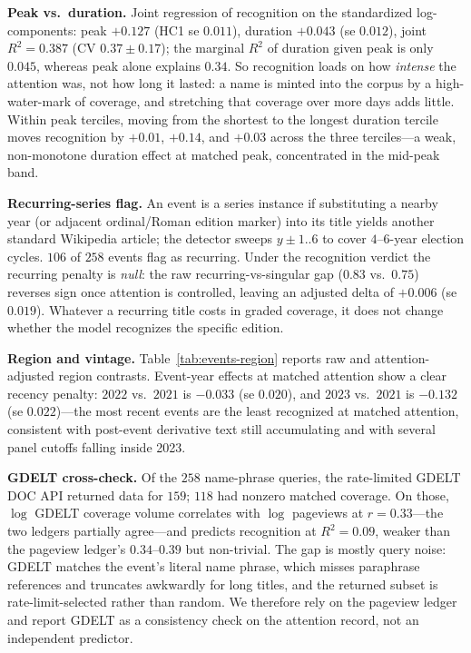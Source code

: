 \textbf{Peak vs.\ duration.} Joint regression of recognition on the standardized log-components: peak $+0.127$ (HC1 se $0.011$), duration $+0.043$ (se $0.012$), joint $R^2 = 0.387$ (CV $0.37 \pm 0.17$); the marginal $R^2$ of duration given peak is only $0.045$, whereas peak alone explains $0.34$. So recognition loads on how \emph{intense} the attention was, not how long it lasted: a name is minted into the corpus by a high-water-mark of coverage, and stretching that coverage over more days adds little. Within peak terciles, moving from the shortest to the longest duration tercile moves recognition by $+0.01$, $+0.14$, and $+0.03$ across the three terciles---a weak, non-monotone duration effect at matched peak, concentrated in the mid-peak band.

\textbf{Recurring-series flag.} An event is a series instance if substituting a nearby year (or adjacent ordinal/Roman edition marker) into its title yields another standard Wikipedia article; the detector sweeps $y \pm 1..6$ to cover $4$--$6$-year election cycles. $106$ of $258$ events flag as recurring. Under the recognition verdict the recurring penalty is \emph{null}: the raw recurring-vs-singular gap ($0.83$ vs.\ $0.75$) reverses sign once attention is controlled, leaving an adjusted delta of $+0.006$ (se $0.019$). Whatever a recurring title costs in graded coverage, it does not change whether the model recognizes the specific edition.

\textbf{Region and vintage.} Table~\ref{tab:events-region} reports raw and attention-adjusted region contrasts. Event-year effects at matched attention show a clear recency penalty: $2022$ vs.\ $2021$ is $-0.033$ (se $0.020$), and $2023$ vs.\ $2021$ is $-0.132$ (se $0.022$)---the most recent events are the least recognized at matched attention, consistent with post-event derivative text still accumulating and with several panel cutoffs falling inside 2023.

\textbf{GDELT cross-check.} Of the $258$ name-phrase queries, the rate-limited GDELT DOC API returned data for $159$; $118$ had nonzero matched coverage. On those, $\log$ GDELT coverage volume correlates with $\log$ pageviews at $r = 0.33$---the two ledgers partially agree---and predicts recognition at $R^2 = 0.09$, weaker than the pageview ledger's $0.34$--$0.39$ but non-trivial. The gap is mostly query noise: GDELT matches the event's literal name phrase, which misses paraphrase references and truncates awkwardly for long titles, and the returned subset is rate-limit-selected rather than random. We therefore rely on the pageview ledger and report GDELT as a consistency check on the attention record, not an independent predictor.

